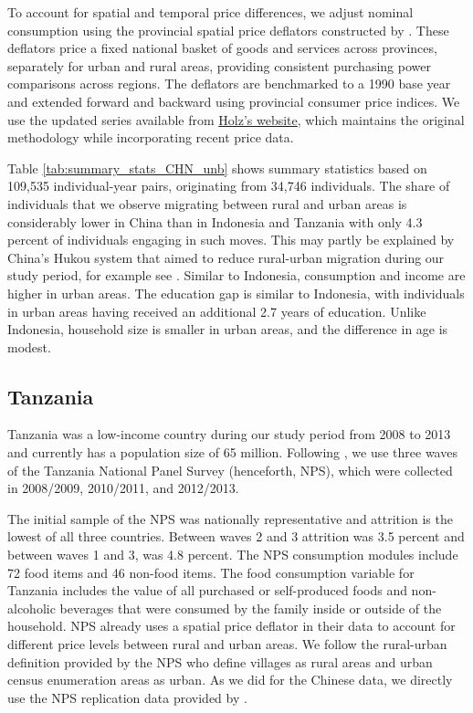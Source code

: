 To account for spatial and temporal price differences, we adjust nominal consumption using the provincial spatial price deflators constructed by \citet{brandt2006spatial}. 
These deflators price a fixed national basket of goods and services across provinces, separately for urban and rural areas, providing consistent purchasing power comparisons across regions. 
The deflators are benchmarked to a 1990 base year and extended forward and backward using provincial consumer price indices. 
We use the updated series available from \href{https://carstenholz.people.ust.hk/SpatialDeflators.html}{Holz's website}, which maintains the original methodology while incorporating recent price data.

Table \ref{tab:summary_stats_CHN_unb} shows summary statistics based on 109,535 individual-year pairs, originating from 34,746 individuals. The share of individuals that we observe migrating between rural and urban areas is considerably lower in China than in Indonesia and Tanzania with only 4.3 percent of individuals engaging in such moves. This may partly be explained by China's Hukou system that aimed to reduce rural-urban migration during our study period, for example see \cite{khanna2021productivity}.
Similar to Indonesia, consumption and income are higher in urban areas. The education gap is similar to Indonesia, with individuals in urban areas having received an additional 2.7 years of education. Unlike Indonesia, household size is smaller in urban areas, and the difference in age is modest.


\subsection{Tanzania}\label{subsec:Tanzania-data}
Tanzania was a low-income country during our study period from 2008 to 2013 and currently has a population size of 65 million. Following \cite{lagakosMigrationCostsObservational2020}, we use three waves of the Tanzania National Panel Survey (henceforth, NPS), which were collected in 2008/2009, 2010/2011, and 2012/2013. 

The initial sample of the NPS was nationally representative and attrition is the lowest of all three countries.  Between waves 2 and 3 attrition was 3.5 percent and between waves 1 and 3, was 4.8 percent. The NPS consumption modules include 72 food items and 46 non-food items.
The food consumption variable for Tanzania includes the value of all purchased or self-produced foods and non-alcoholic beverages that were consumed by the family inside or outside of the household. 
NPS already uses a spatial price deflator in their data to account for different price levels between rural and urban areas. 
We follow the rural-urban definition provided by the NPS who define villages as rural areas and urban census enumeration areas as urban.
As we did for the Chinese data, we directly use the NPS replication data provided by \cite{lagakosMigrationCostsObservational2020}.

